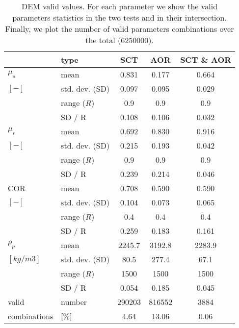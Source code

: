 \begin{table}[h]
\centering
\begin{tabular}{llccc}
\hline

          & type  & SCT & AOR   & SCT \& AOR \\
          \hline

    $\mu_s$ & mean  & 0.831 & 0.177 & 0.664 \\
    $[-]$   & std. dev. (SD) & 0.097 & 0.095 & 0.029 \\
          & range ($R$) & 0.9   & 0.9   & 0.9 \\
          & SD / R & 0.108 & 0.106 & 0.032 \\
          \hline
    $\mu_r$ & mean  & 0.692 & 0.830 & 0.916 \\
    $[-]$   & std. dev. (SD) & 0.215 & 0.193 & 0.042 \\
          & range ($R$) & 0.9   & 0.9   & 0.9 \\
          & SD / R & 0.239 & 0.214 & 0.046 \\
          \hline
              COR   & mean  & 0.708 & 0.590 & 0.590 \\
   $ [-]$   & std. dev. (SD) & 0.104 & 0.073 & 0.065 \\
          & range ($R$) & 0.4   & 0.4   & 0.4 \\
          & SD / R & 0.259 & 0.183 & 0.161 \\
          \hline
    $\rho_p$ & mean  & 2245.7 & 3192.8 & 2283.9 \\
    $[kg/m3]$ & std. dev. (SD) & 80.5  & 277.4 & 67.1 \\
          & range ($R$) & 1500  & 1500  & 1500 \\
          & SD / R & 0.054 & 0.185 & 0.045 \\
          \hline
    valid & number & 290203 & 816552 & 3884 \\
    combinations & [$\%$] & 4.64  & 13.06 & 0.06 \\
    

\hline
\end{tabular}
\caption[DEM valid values]{DEM valid values. For each parameter we show the
valid parameters statistics in the two tests and in their intersection.
Finally, we plot the number of valid parameters combinations over the total
(6250000).}
\label{tab:13DEMvalidvalues}
\end{table}